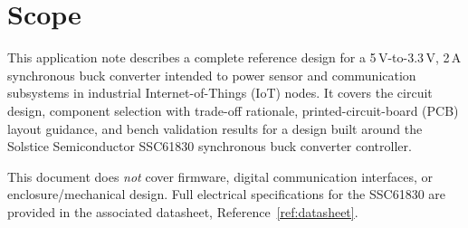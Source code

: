 \section{Scope}
This application note describes a complete reference design for a 5\,V-to-3.3\,V,
2\,A synchronous buck converter intended to power sensor and communication
subsystems in industrial Internet-of-Things (IoT) nodes. It covers the circuit
design, component selection with trade-off rationale, printed-circuit-board
(PCB) layout guidance, and bench validation results for a design built around
the Solstice Semiconductor SSC61830 synchronous buck converter controller.

This document does \emph{not} cover firmware, digital communication interfaces,
or enclosure/mechanical design. Full electrical specifications for the
SSC61830 are provided in the associated datasheet, Reference~\ref{ref:datasheet}.

